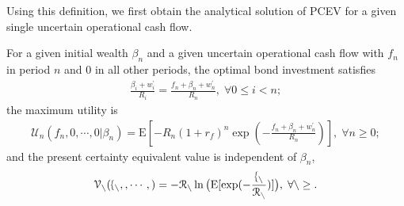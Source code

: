 \documentclass[mnsc,nonblindrev,copyedit]{informs2_wz} %
\newcommand{\E}{\mathrm{E}}
\newcommand{\V}{\cal{V}}
\begin{document}
Using this definition, we first obtain the analytical solution of PCEV for a given single uncertain operational cash flow.

\begin{lemma} \label{lem:pcev-Xn-gen}
For a given initial wealth $\beta_n$ and a given uncertain operational cash flow with $f_n$ in period $n$ and $0$ in all other periods, the optimal bond investment satisfies
\begin{eqnarray}\label{eqn:beta-Xn}
\frac{\beta_i + w_i^\prime}{R_i} = \frac{f_n+\beta_n + w_n^\prime}{R_n}, \; \forall 0\leq i< n;
\end{eqnarray}
the maximum utility is
\begin{eqnarray} \label{eqn:Un-Xn}
\mathcal{U}_n(f_n, 0, \cdots, 0|\beta_{n}) = \E[-R_n (1+r_f)^n \exp (-  \frac{f_n + \beta_n +w_n^\prime}{R_n})], \; \forall n \geq 0;
\end{eqnarray}
and the present certainty equivalent value is independent of $\beta_n$,
\begin{eqnarray}
\V_n(f_n,0,\cdots,0)=-R_n \ln\big{(} \E[\exp(-\frac{f_n}{R_n})]\big{)}, \; \forall n \geq 0. \label{eqn:pcev-Xn-gen}
\end{eqnarray}
\end{lemma}
\end{document}
